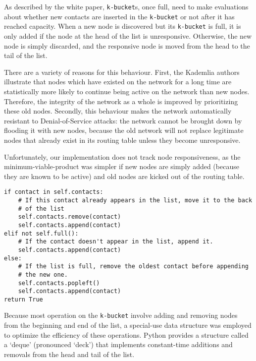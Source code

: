 \documentclass[12pt]{report}
\newcommand{\code}[1]{\colorbox{codegray}{\texttt{#1}}}
\begin{document}
                As described by the white
                paper, \code{k-bucket}s, once full, need to make evaluations
                about whether new contacts are inserted in the \code{k-bucket}
                or not after it has reached capacity.  When a new node is
                discovered but its \code{k-bucket} is full, it is only added if
                the node at the head of the list is unresponsive.  Otherwise,
                the new node is simply discarded, and the responsive node is
                moved from the head to the tail of the list.

                There are a variety of reasons for this behaviour.  First, the
                Kademlia authors illustrate that nodes which have existed on
                the network for a long time are statistically more likely to
                continue being active on the network than new nodes.
                Therefore, the integrity of the network as a whole is improved
                by prioritizing these old nodes.  Secondly, this behaviour
                makes the network automatically resistant to Denial-of-Service
                attacks: the network cannot be brought down by flooding it with
                new nodes, because the old network will not replace legitimate
                nodes that already exist in its routing table unless they
                become unresponsive.

                Unfortunately, our implementation does not track node
                responsiveness, as the minimum-viable-product was simpler if
                new nodes are simply added (because they are known to be
                active) and old nodes are kicked out of the routing table.

\begin{lstlisting}[label=KBucket.add]
if contact in self.contacts:
    # If this contact already appears in the list, move it to the back
    # of the list
    self.contacts.remove(contact)
    self.contacts.append(contact)
elif not self.full():
    # If the contact doesn't appear in the list, append it.
    self.contacts.append(contact)
else:
    # If the list is full, remove the oldest contact before appending
    # the new one.
    self.contacts.popleft()
    self.contacts.append(contact)
return True
\end{lstlisting}
            Because most operation on the \code{k-bucket} involve adding and
            removing nodes from the beginning and end of the list, a
            special-use data structure was employed to optimize the efficiency
            of these operations.  Python provides a structure called a `deque'
            (pronounced `deck') that implements constant-time additions and
            removals from the head and tail of the list.
\end{document}
